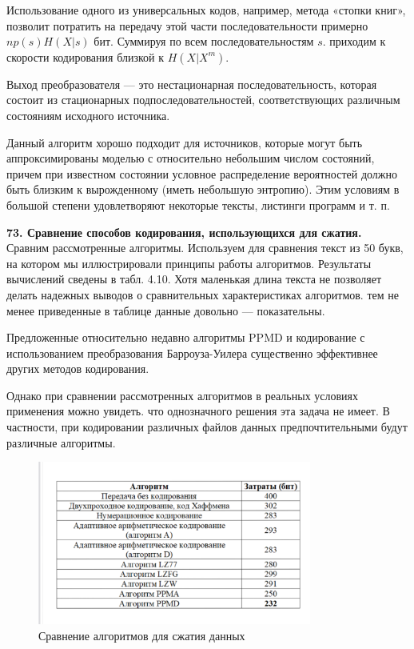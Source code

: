 \documentclass[14pt]{article}
\begin{document}
Использование одного из универсальных кодов, например, метода «стопки книг», позволит потратить на передачу этой части последовательности примерно \(np(s)H(X|s)\) бит. Суммируя по всем последовательностям \(s\). приходим к скорости кодирования близкой к \(H(X|X^m)\).

Выход преобразователя — это нестационарная последовательность, которая состоит из стационарных подпоследовательностей, соответствующих различным состояниям исходного источника.

Данный алгоритм хорошо подходит для источников, которые могут быть аппроксимированы моделью с относительно небольшим числом состояний, причем при известном состоянии условное распределение вероятностей должно быть близким к вырожденному (иметь небольшую энтропию). Этим условиям в большой степени удовлетворяют некоторые тексты, листинги программ и т. п.

\bigskip
\textbf{73. Сравнение способов кодирования, использующихся для сжатия.} \\

Сравним рассмотренные алгоритмы. Используем для сравнения текст из 50 букв, на котором мы иллюстрировали принципы работы алгоритмов. Результаты вычислений сведены в табл. 4.10. Хотя маленькая длина текста не позволяет делать надежных выводов о сравнительных характеристиках алгоритмов. тем не менее приведенные в таблице данные довольно — показательны.

Предложенные относительно недавно алгоритмы PPMD и кодирование с использованием преобразования Барроуза-Уилера существенно эффективнее других методов кодирования.

Однако при сравнении рассмотренных алгоритмов в реальных условиях применения можно увидеть. что однозначного решения эта задача не имеет. В частности, при кодировании различных файлов данных предпочтительными будут различные алгоритмы.

\begin{figure}[h!]
\centering
    \includegraphics[width=90mm]{compare_archive_algs.png}
\caption{Сравнение алгоритмов для сжатия данных}
\end{figure}
\end{document}
